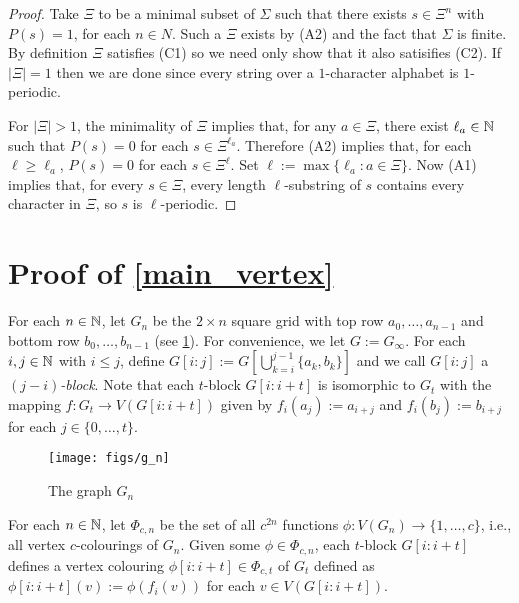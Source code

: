 \documentclass{patmorin}
\begin{document}
\begin{proof}
    Take $\Xi$ to be a minimal subset of $\Sigma$ such that there exists $s\in\Xi^n$ with $P(s)=1$, for each $n\in N$.  Such a $\Xi$ exists by (A2) and the fact that $\Sigma$ is finite. By definition $\Xi$ satisfies (C1) so we need only show that it also satisifies (C2).  If $|\Xi|=1$ then we are done since every string over a $1$-character alphabet is $1$-periodic.

    For $|\Xi|>1$, the minimality of $\Xi$ implies that, for any $a\in\Xi$, there exist $\ell_a\in\mathbb{N}$ such that $P(s)=0$ for each $s\in\Xi^{\ell_a}$.  Therefore (A2) implies that, for each $\ell\ge\ell_a$, $P(s)=0$ for each $s\in\Xi^{\ell}$. Set $\ell:=\max\{\ell_a:a\in \Xi\}$.  Now (A1) implies that, for every $s\in\Xi$, every length $\ell$-substring of $s$ contains every character in $\Xi$, so $s$ is $\ell$-periodic.
\end{proof}


\section{Proof of \cref{main_vertex}}
\label{vertex_colourings}

For each $n\in\mathbb{N}$, let $G_n$ be the $2\times n$ square grid with top row $a_0,\ldots,a_{n-1}$ and bottom row $b_0,\ldots,b_{n-1}$ (see \cref{g_n}). For convenience, we let $G:=G_\infty$.  For each $i,j\in\mathbb{N}$ with $i\le j$, define $G[i\mathbin{:}j]:=G[\bigcup_{k=i}^{j-1}\{a_k,b_k\}]$ and we call $G[i\mathbin{:}j]$ a \emph{$(j-i)$-block}. Note that each $t$-block $G[i\mathbin{:}i+t]$ is isomorphic to $G_t$ with the mapping $f:G_t\to V(G[i\mathbin{:}i+t])$ given by $f_i(a_{j}):=a_{i+j}$ and $f_i(b_{j}):=b_{i+j}$ for each $j\in\{0,\ldots,t\}$.

\begin{figure}
    \begin{center}
        \texttt{[image: figs/g\_n]}
    \end{center}
    \caption{The graph $G_n$}
    \label{g_n}
\end{figure}

For each $n\in\mathbb{N}$, let $\Phi_{c,n}$ be the set of all $c^{2n}$ functions $\phi:V(G_n)\to\{1,\ldots,c\}$, i.e., all vertex $c$-colourings of $G_n$.
Given some $\phi\in\Phi_{c,n}$, each $t$-block $G[i\mathbin{:}i+t]$ defines a vertex colouring $\phi[i\mathbin{:}i+t]\in \Phi_{c,t}$ of $G_t$ defined as $\phi[i\mathbin{:}i+t](v):=\phi(f_i(v))$ for each $v\in V(G[i\mathbin{:}i+t])$.
\end{document}
